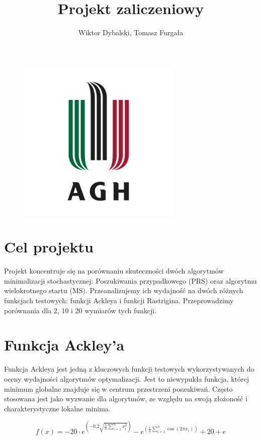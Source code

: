 \documentclass{article}
\title{Projekt zaliczeniowy}
\author{Wiktor Dybalski, Tomasz Furgała}
\begin{document}
\maketitle
\begin{figure}[H]
    \centering
    \includegraphics[width=0.7\textwidth]{img/logo.jpg}
    \label{fig:rastrigin}
\end{figure}
\newpage

\section{Cel projektu}
\hspace{0.5cm} Projekt koncentruje się na porównaniu skuteczności dwóch algorytmów minimalizacji stochastycznej: Poszukiwania przypadkowego (PRS) oraz algorytmu wielokrotnego startu (MS). Przeanalizujemy ich wydajność na dwóch różnych funkcjach testowych: funkcji Ackleya i funkcji Rastrigina. Przeprowadzimy porównania dla 2, 10 i 20 wymiarów tych funkcji.

\section{Funkcja Ackley'a}

\hspace{0.5cm} Funkcja Ackleya jest jedną z kluczowych funkcji testowych wykorzystywanych do oceny wydajności algorytmów optymalizacji. Jest to niewypukła funkcja, której minimum globalne znajduje się w centrum przestrzeni poszukiwań. Często stosowana jest jako wyzwanie dla algorytmów, ze względu na swoją złożoność i charakterystyczne lokalne minima.

\[ f(x) = -20 \cdot e^{\left(-0.2 \sqrt{\frac{1}{n} \sum_{i=1}^{n}x_i^2}\right)} - e^{\left(\frac{1}{n} \sum_{i=1}^{n} \cos(2\pi x_i)\right)} + 20 + e
 \]
\end{document}
